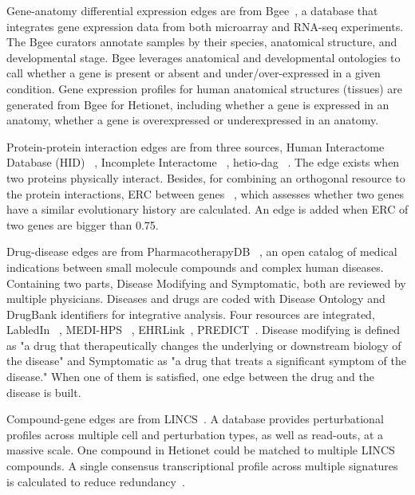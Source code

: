 Gene-anatomy differential expression edges are from Bgee~\cite{bairoch_bgee:_2008}, a database that integrates gene expression data from both microarray and RNA-seq experiments. The Bgee curators annotate samples by their species, anatomical structure, and developmental stage. Bgee leverages anatomical and developmental ontologies to call whether a gene is present or absent and under/over-expressed in a given condition. Gene expression profiles for human anatomical structures (tissues) are generated from Bgee for Hetionet, including whether a gene is expressed in an anatomy, whether a gene is overexpressed or underexpressed in an anatomy.

Protein-protein interaction edges are from three sources, Human Interactome Database (HID) ~\cite{luck_reference_2019}, Incomplete Interactome ~\cite{menche_uncovering_2015}, hetio-dag ~\cite{himmelstein_heterogeneous_2015}. The edge exists when two proteins physically interact. Besides, for combining an orthogonal resource to the protein interactions, \ac{ERC} between genes ~\cite{himmelstein_systematic_2017}, which assesses whether two genes have a similar evolutionary history are calculated. An edge is added when \ac{ERC} of two genes are bigger than 0.75.

Drug-disease edges are from PharmacotherapyDB ~\cite{himmelstein_announcing_2016}, an open catalog of medical indications between small molecule compounds and complex human diseases. Containing two parts, Disease Modifying and Symptomatic, both are reviewed by multiple physicians. Diseases and drugs are coded with Disease Ontology and DrugBank identifiers for integrative analysis. Four resources are integrated, LabledIn ~\cite{khare_labeledin:_2014}, MEDI-HPS~\cite{wei_development_2013} , EHRLink~\cite{mccoy_development_2012}, PREDICT~\cite{gottlieb_predict:_2011}. Disease modifying is defined as "a drug that therapeutically changes the underlying or downstream biology of the disease" and Symptomatic as "a drug that treats a significant symptom of the disease." When one of them is satisfied, one edge between the drug and the disease is built.

Compound-gene edges are from \ac{LINCS}~\cite{koleti_data_2018}. A database provides perturbational profiles across multiple cell and perturbation types, as well as read-outs, at a massive scale. One compound in Hetionet could be matched to multiple \ac{LINCS} compounds. A single consensus transcriptional profile across multiple signatures is calculated to reduce redundancy~\cite{himmelstein_computing_2015}.

